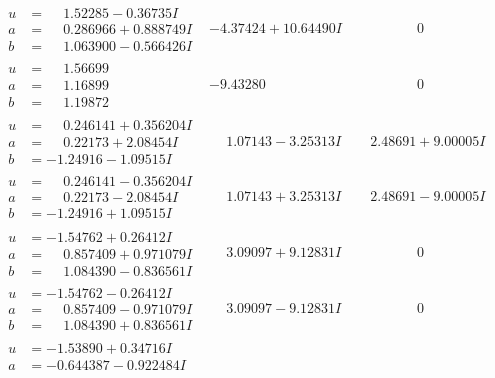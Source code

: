 \documentclass[1p]{elsarticle_modified}
\theoremstyle{definition}
\begin{document}
$$\begin{array}{c|c|c}
\begin{aligned}
u &= \phantom{-}1.52285 - 0.36735 I \\
a &= \phantom{-}0.286966 + 0.888749 I \\
b &= \phantom{-}1.063900 - 0.566426 I\end{aligned}
 & -4.37424 + 10.64490 I & \phantom{-0.000000 } 0 \\ \hline\begin{aligned}
u &= \phantom{-}1.56699\phantom{ +0.000000I} \\
a &= \phantom{-}1.16899\phantom{ +0.000000I} \\
b &= \phantom{-}1.19872\phantom{ +0.000000I}\end{aligned}
 & -9.43280\phantom{ +0.000000I} & \phantom{-0.000000 } 0 \\ \hline\begin{aligned}
u &= \phantom{-}0.246141 + 0.356204 I \\
a &= \phantom{-}0.22173 + 2.08454 I \\
b &= -1.24916 - 1.09515 I\end{aligned}
 & \phantom{-}1.07143 - 3.25313 I & \phantom{-}2.48691 + 9.00005 I \\ \hline\begin{aligned}
u &= \phantom{-}0.246141 - 0.356204 I \\
a &= \phantom{-}0.22173 - 2.08454 I \\
b &= -1.24916 + 1.09515 I\end{aligned}
 & \phantom{-}1.07143 + 3.25313 I & \phantom{-}2.48691 - 9.00005 I \\ \hline\begin{aligned}
u &= -1.54762 + 0.26412 I \\
a &= \phantom{-}0.857409 + 0.971079 I \\
b &= \phantom{-}1.084390 - 0.836561 I\end{aligned}
 & \phantom{-}3.09097 + 9.12831 I & \phantom{-0.000000 } 0 \\ \hline\begin{aligned}
u &= -1.54762 - 0.26412 I \\
a &= \phantom{-}0.857409 - 0.971079 I \\
b &= \phantom{-}1.084390 + 0.836561 I\end{aligned}
 & \phantom{-}3.09097 - 9.12831 I & \phantom{-0.000000 } 0 \\ \hline\begin{aligned}
u &= -1.53890 + 0.34716 I \\
a &= -0.644387 - 0.922484 I \\

\end{aligned}
\end{array}$$
\end{document}
